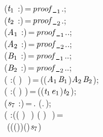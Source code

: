 \begin{holmath}
\,\,\,(\ensuremath{\HOLBoundVar{t}\sb{\mathrm{1}}} :)\,=\,\ensuremath{\HOLBoundVar{proof\HOLTokenUnderscore{}}\sb{\mathrm{1}}}.;\\
\,\,\,(\ensuremath{\HOLBoundVar{t}\sb{\mathrm{2}}} :)\,=\,\ensuremath{\HOLBoundVar{proof\HOLTokenUnderscore{}}\sb{\mathrm{2}}}.;\\
\,\,\,(\ensuremath{\HOLBoundVar{A}\sb{\mathrm{1}}} :)\,=\,\ensuremath{\HOLBoundVar{proof\HOLTokenUnderscore{}}\sb{\mathrm{1}}}..;\\
\,\,\,(\ensuremath{\HOLBoundVar{A}\sb{\mathrm{2}}} :)\,=\,\ensuremath{\HOLBoundVar{proof\HOLTokenUnderscore{}}\sb{\mathrm{2}}}..;\\
\,\,\,(\ensuremath{\HOLBoundVar{B}\sb{\mathrm{1}}} :)\,=\,\ensuremath{\HOLBoundVar{proof\HOLTokenUnderscore{}}\sb{\mathrm{1}}}..;\\
\,\,\,(\ensuremath{\HOLBoundVar{B}\sb{\mathrm{2}}} :)\,=\,\ensuremath{\HOLBoundVar{proof\HOLTokenUnderscore{}}\sb{\mathrm{2}}}..;\\
\,\,\,( :(\,\HOLTokenProd{}\,)\,\HOLTokenProd{}\,\,\HOLTokenProd{}\,)\,=\,((\ensuremath{\HOLBoundVar{A}\sb{\mathrm{1}}}\HOLSymConst{,}\ensuremath{\HOLBoundVar{B}\sb{\mathrm{1}}})\HOLSymConst{,}\ensuremath{\HOLBoundVar{A}\sb{\mathrm{2}}}\HOLSymConst{,}\ensuremath{\HOLBoundVar{B}\sb{\mathrm{2}}});\\
\,\,\,( :(\,\HOLTokenProd{}\,)\,\HOLTokenProd{}\,)\,=\,((\ensuremath{\HOLBoundVar{t}\sb{\mathrm{1}}}\HOLSymConst{,}\ensuremath{\HOLBoundVar{e}\sb{\mathrm{1}}})\HOLSymConst{,}\ensuremath{\HOLBoundVar{t}\sb{\mathrm{2}}});\\
\,\,\,(\ensuremath{\HOLBoundVar{s}\sb{\mathrm{7}}} :)\,=\,.\,\HOLBoundVar{\ensuremath{\beta}}\,(.\,);\\
\,\,\,( :((\,\HOLTokenProd{}\,)\,\HOLTokenProd{}\,\,\HOLTokenProd{}\,)\,\HOLTokenProd{}\,(\,\HOLTokenProd{}\,)\,\HOLTokenProd{}\,\,\HOLTokenProd{}\,)\,=\\
\,\,\,\,\,(((\HOLSymConst{,}\HOLBoundVar{\ensuremath{\alpha}})\HOLSymConst{,}\HOLSymConst{,}\HOLBoundVar{\ensuremath{\beta}})\HOLSymConst{,}(\HOLSymConst{,}\HOLBoundVar{\ensuremath{\alpha}})\HOLSymConst{,}\HOLSymConst{,}\ensuremath{\HOLBoundVar{s}\sb{\mathrm{7}}})\\

\end{holmath}
